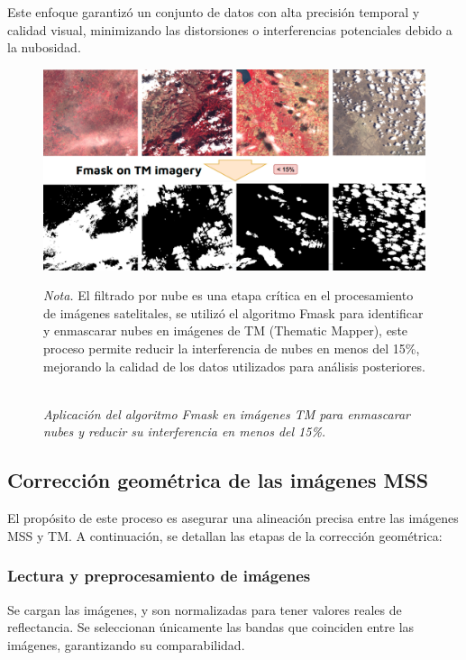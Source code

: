                 Este enfoque garantizó un conjunto de datos con alta precisión temporal y calidad visual, minimizando las distorsiones o interferencias potenciales debido a la nubosidad.

                \begin{figure}[H] 
                    \caption{\doublespacing \\ \textit{Aplicación del algoritmo Fmask en imágenes TM para enmascarar nubes y reducir su interferencia en menos del 15\%.}} 
                    \centering
                    \includegraphics[width=1\linewidth]{2_CAPITULO4/IMG/fmask.png}
                    \begin{justify}
                        \textit{Nota.} El filtrado por nube es una etapa crítica en el procesamiento de imágenes satelitales, se utilizó el algoritmo Fmask para identificar y enmascarar nubes en imágenes de TM (Thematic Mapper), este proceso permite reducir la interferencia de nubes en menos del 15\%, mejorando la calidad de los datos utilizados para análisis posteriores.
                    \end{justify}                    
                    \label{fmask}
                \end{figure}
  
        \subsection{Corrección geométrica de las imágenes MSS}
            El propósito de este proceso es asegurar una alineación precisa entre las imágenes MSS y TM. A continuación, se detallan las etapas de la corrección geométrica:
            
            \subsubsection{Lectura y preprocesamiento de imágenes}
                Se cargan las imágenes, y son normalizadas para tener valores reales de reflectancia. Se seleccionan únicamente las bandas que coinciden entre las imágenes, garantizando su comparabilidad.
            
